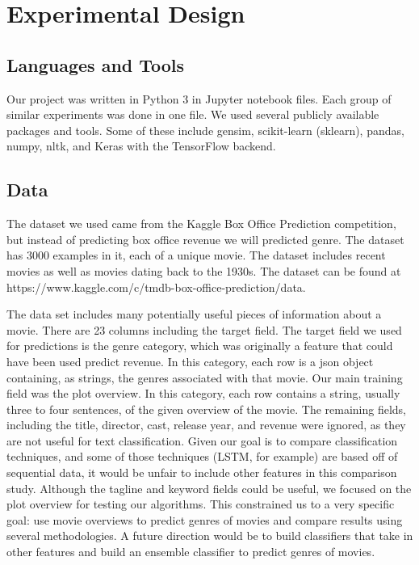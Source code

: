 \documentclass[sigconf]{acmart}
\begin{document}
\section{Experimental Design}
\subsection{Languages and Tools}
Our project was written in Python 3 in Jupyter notebook files.  Each group of similar experiments was done in one file.  We used several publicly available packages and tools.  Some of these include gensim, scikit-learn (sklearn), pandas, numpy, nltk, and Keras with the TensorFlow backend. 

\subsection{Data}
The dataset we used came from the Kaggle Box Office Prediction competition, but instead of predicting box office revenue we will predicted genre.  The dataset has 3000 examples in it, each of a unique movie.  The dataset includes recent movies as well as movies dating back to the 1930s. The dataset can be found at https://www.kaggle.com/c/tmdb-box-office-prediction/data.

The data set includes many potentially useful pieces of information about a movie. There are 23 columns including the target field. The target field we used for predictions is the genre category, which was originally a feature that could have been used predict revenue. In this category, each row is a json object containing, as strings, the genres associated with that movie. Our main training field was the plot overview. In this category, each row contains a string, usually three to four sentences, of the given overview of the movie. The remaining fields, including the title, director, cast, release year, and revenue were ignored, as they are not useful for text classification. Given our goal is to compare classification techniques, and some of those techniques (LSTM, for example) are based off of sequential data, it would be unfair to include other features in this comparison study. Although the tagline and keyword fields could be useful, we focused on the plot overview for testing our algorithms. This constrained us to a very specific goal: use movie overviews to predict genres of movies and compare results using several methodologies. A future direction would be to build classifiers that take in other features and build an ensemble classifier to predict genres of movies. 
\end{document}
